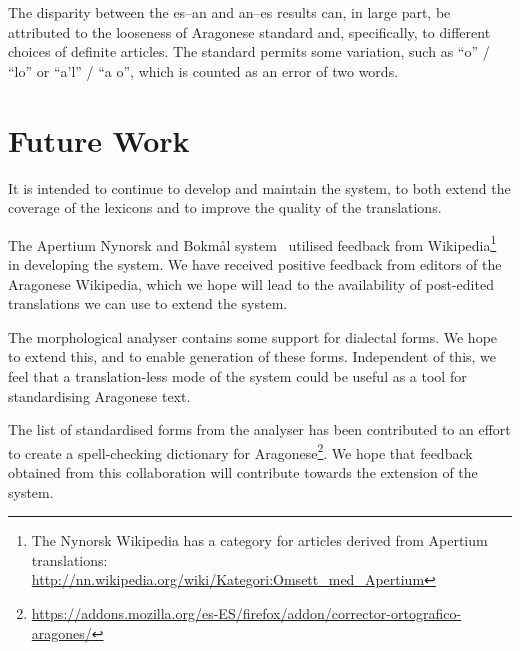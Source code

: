 \documentclass[10pt, a4paper]{article}
\begin{document}
  The disparity between the es--an and an--es results can, in large part, be attributed to the looseness of Aragonese standard and, specifically, to different choices of definite articles. The standard permits some variation, such as ``o'' / ``lo''  or ``a'l'' / ``a o'', which is counted as an error of two words.
  
  \section{Future Work}
  
  It is intended to continue to develop and maintain the system, to both extend the coverage of the lexicons and to improve the quality of the translations.
  
  The Apertium Nynorsk and Bokmål system~\cite{Unhammer} utilised feedback from Wikipedia\footnote{The Nynorsk Wikipedia has a category for articles derived from Apertium translations: {\small \url{http://nn.wikipedia.org/wiki/Kategori:Omsett_med_Apertium}}} in developing the system. We have received positive feedback from editors of the Aragonese Wikipedia, which we hope will lead to the availability of post-edited translations we can use to extend the system. 
  
  The morphological analyser contains some support for dialectal forms. We hope to extend this, and to enable generation of these forms. Independent of this, we feel that a translation-less mode of the system could be useful as a tool for standardising Aragonese text.
  
  The list of standardised forms from the analyser has been contributed to an effort to create a spell-checking dictionary for Aragonese\footnote{\url{https://addons.mozilla.org/es-ES/firefox/addon/corrector-ortografico-aragones/}}. We hope that feedback obtained from this collaboration will contribute towards the extension of the system.
\end{document}
